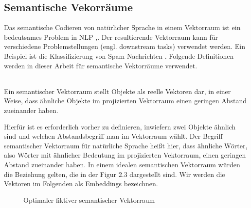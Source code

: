 \documentclass[12pt,letterpaper,ngerman]{article}
\begin{document}
\subsection{Semantische Vekorräume}
Das semantische Codieren von natürlicher Sprache in einem Vektorraum 
ist ein bedeutsames Problem in NLP
\cite{word2vec} ,\cite{reimers-2019-sentence-bert}.
Der resultierende Vektorraum kann
für verschiedene Problemstellungen (engl. downstream tasks) verwendet
werden. Ein Beispiel ist die Klassifizierung von Spam Nachrichten 
\cite{Ball2019}. Folgende Definitionen werden in dieser Arbeit 
für semantische Vektorräume verwendet.
\begin{definition}
  \hfill\\
  Ein semantischer Vektorraum stellt Objekte als reelle Vektoren 
  dar, in einer Weise, dass ähnliche Objekte im projizierten 
  Vektorraum einen geringen Abstand zueinander haben.
\end{definition}
Hierfür ist es erforderlich vorher zu definieren, inwiefern zwei
Objekte ähnlich sind und welchen Abstandsbegriff man im Vektorraum 
wählt.
Der Begriff semantischer Vektorraum für natürliche Sprache heißt
hier, dass ähnliche Wörter, also Wörter mit ähnlicher Bedeutung 
im projizierten Vektorraum, einen geringen Abstand zueinander haben.  
In einem idealen semantischen Vektorraum würden
die Beziehung gelten, die in der Figur 2.3 dargestellt sind.
Wir werden die Vektoren im Folgenden als Embeddings bezeichnen.
\begin{figure}
  \begin{center}
  \end{center}
  \caption{Optimaler fiktiver semantischer Vektorraum}
\end{figure}
\end{document}
